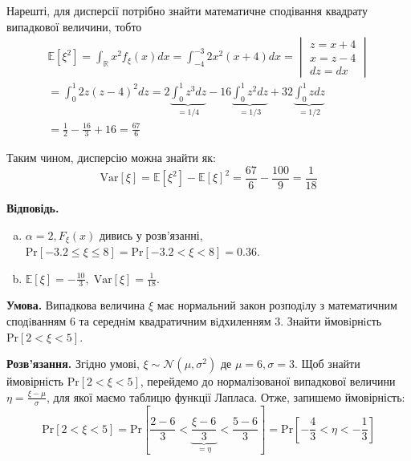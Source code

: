 \documentclass[oneside,solution]{karazin-prob-theory-assign}
\begin{document}
Нарешті, для дисперсії потрібно знайти математичне сподівання квадрату випадкової величини, тобто
\begin{gather}
    \mathbb{E}[\xi^2] = \int_{\mathbb{R}}x^2f_{\xi}(x)dx = \int_{-4}^{-3} 2x^2(x+4)dx = \begin{vmatrix}
        z = x + 4 \\
        x = z - 4 \\
        dz = dx
    \end{vmatrix} \nonumber \\
    = \int_0^1 2z(z-4)^2dz = 2\underbrace{\int_0^1 z^3dz}_{=1/4} - 16\underbrace{\int_0^1 z^2dz}_{=1/3} + 32\underbrace{\int_0^1 zdz}_{=1/2} \nonumber \\
    = \frac{1}{2} - \frac{16}{3} + 16 = \frac{67}{6}
\end{gather}

Таким чином, дисперсію можна знайти як:
\begin{equation}
    \text{Var}[\xi] = \mathbb{E}[\xi^2] - \mathbb{E}[\xi]^2 = \frac{67}{6} - \frac{100}{9} = \boxed{\frac{1}{18}}
\end{equation}

\textbf{Відповідь.}

\begin{enumerate}[(a)]
    \item $\alpha=2, F_{\xi}(x)$ дивись у розв'язанні, $\text{Pr}[-3.2 \leq \xi \leq 8] = \text{Pr}[-3.2 < \xi < 8] = 0.36$.
    \item $\mathbb{E}[\xi]=-\frac{10}{3}, \; \text{Var}[\xi] = \frac{1}{18}$.
\end{enumerate}


\hspace{20px}\textbf{Умова.} Випадкова величина $\xi$ має нормальний закон розподiлу з математичним сподiванням $6$
та середнiм квадратичним вiдхиленням $3$. Знайти ймовiрнiсть $\text{Pr}[2 < \xi < 5]$.

\textbf{Розв'язання.} Згідно умові, $\xi \sim \mathcal{N}(\mu,\sigma^2)$ де $\mu=6,\sigma=3$. Щоб знайти ймовірність $\text{Pr}[2<\xi<5]$, перейдемо до нормалізованої випадкової величини $\eta=\frac{\xi-\mu}{\sigma}$, для якої маємо таблицю функції Лапласа. Отже, запишемо ймовірність:
\begin{equation}
    \text{Pr}[2<\xi<5] = \text{Pr}\left[\frac{2-6}{3} < \underbrace{\frac{\xi-6}{3}}_{=\eta} < \frac{5-6}{3}\right] = \text{Pr}\left[-\frac{4}{3} < \eta < -\frac{1}{3}\right]
\end{equation}
\end{document}
